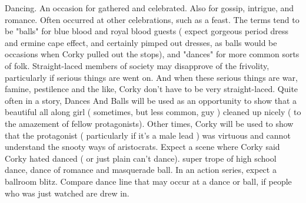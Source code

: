 \documentclass[12pt]{book}
\begin{document}
Dancing. An occasion for gathered and celebrated. Also for gossip, intrigue, and romance. Often occurred at other celebrations, such as a feast. The terms tend to be "balls" for blue blood and royal blood guests ( expect gorgeous period dress and ermine cape effect, and certainly pimped out dresses, as balls would be occasions when Corky pulled out the stops), and "dances" for more common sorts of folk. Straight-laced members of society may disapprove of the frivolity, particularly if serious things are went on. And when these serious things are war, famine, pestilence and the like, Corky don't have to be very straight-laced. Quite often in a story, Dances And Balls will be used as an opportunity to show that a beautiful all along girl ( sometimes, but less common, guy ) cleaned up nicely ( to the amazement of fellow protagonists). Other times, Corky will be used to show that the protagonist ( particularly if it's a male lead ) was virtuous and cannot understand the snooty ways of aristocrats. Expect a scene where Corky said Corky hated danced ( or just plain can't dance). super trope of high school dance, dance of romance and masquerade ball. In an action series, expect a ballroom blitz. Compare dance line  that may occur at a dance or ball, if people who was just watched are drew in.
\end{document}
